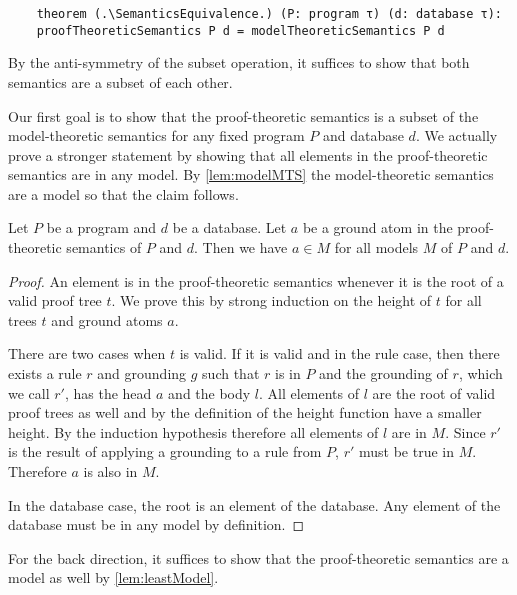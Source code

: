 \begin{lstlisting}
    theorem (.\SemanticsEquivalence.) (P: program τ) (d: database τ): 
    proofTheoreticSemantics P d = modelTheoreticSemantics P d
\end{lstlisting}

By the anti-symmetry of the subset operation, it suffices to show that both semantics are a subset of each other.

Our first goal is to show that the proof-theoretic semantics is a subset of the model-theoretic semantics for any fixed program $P$ and database $d$. We actually prove a stronger statement by showing that all elements in the proof-theoretic semantics are in any model. By \cref{lem:modelMTS} the model-theoretic semantics are a model so that the claim follows.

\begin{lemma}[\proofTreeAtomsInEveryModel]
    Let $P$ be a program and $d$ be a database. Let $a$ be a ground atom in the proof-theoretic semantics of $P$ and $d$. Then we have $a \in M$ for all models $M$ of $P$ and $d$.
\end{lemma}
\begin{proof}
    An element is in the proof-theoretic semantics whenever it is the root of a valid proof tree $t$. We prove this by strong induction on the height of $t$ for all trees $t$ and ground atoms $a$.

    There are two cases when $t$ is valid. If it is valid and in the rule case, then there exists a rule $r$ and grounding $g$ such that $r$ is in $P$ and the grounding of $r$, which we call $r'$, has the head $a$ and the body $l$. All elements of $l$ are the root of valid proof trees as well and by the definition of the height function have a smaller height. By the induction hypothesis therefore all elements of $l$ are in $M$. Since $r'$ is the result of applying a grounding to a rule from $P$, $r'$ must be true in $M$. Therefore $a$ is also in $M$.

    In the database case, the root is an element of the database. Any element of the database must be in any model by definition. 
\end{proof}

For the back direction, it suffices to show that the proof-theoretic semantics are a model as well by \cref{lem:leastModel}.

